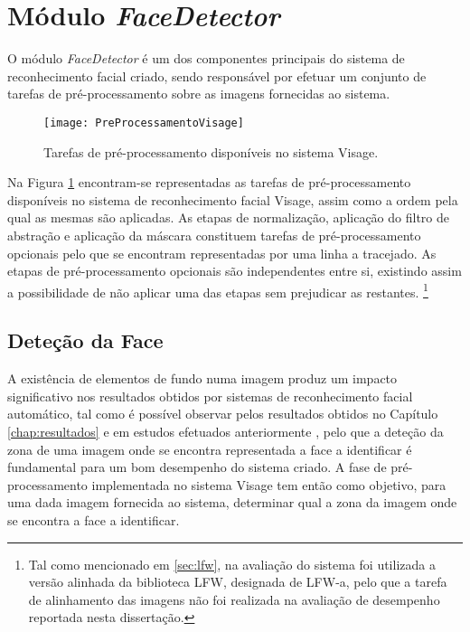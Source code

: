 \section{Módulo \textit{FaceDetector}} \label{sec:facedetector}
O módulo \textit{FaceDetector} é um dos componentes principais do sistema de reconhecimento facial criado, sendo responsável por efetuar um conjunto de tarefas de pré-processamento sobre as imagens fornecidas ao sistema.

\begin{figure}[t]
  \begin{center}
    \leavevmode
    \texttt{[image: PreProcessamentoVisage]}
    \caption{Tarefas de pré-processamento disponíveis no sistema Visage.}
    \label{fig:preprocessamento}
  \end{center}
\end{figure}


Na Figura \ref{fig:preprocessamento} encontram-se representadas as tarefas de pré-processamento disponíveis no sistema de reconhecimento facial Visage, assim como a ordem pela qual as mesmas são aplicadas. As etapas de normalização, aplicação do filtro de abstração e aplicação da máscara constituem tarefas de pré-processamento opcionais pelo que se encontram representadas por uma linha a tracejado. As etapas de pré-processamento opcionais são independentes entre si, existindo assim a possibilidade de não aplicar uma das etapas sem prejudicar as restantes.  \footnote{Tal como mencionado em \ref{sec:lfw}, na avaliação do sistema foi utilizada a versão alinhada da biblioteca LFW, designada de LFW-a, pelo que a tarefa de alinhamento das imagens não foi realizada na avaliação de desempenho reportada nesta dissertação.}

\subsection{Deteção da Face} \label{sec:detecao_face}
A existência de elementos de fundo numa imagem produz um impacto significativo nos resultados obtidos por sistemas de reconhecimento facial automático, tal como é possível observar pelos resultados obtidos no Capítulo \ref{chap:resultados} e em estudos efetuados anteriormente \cite{Kumar2009}, pelo que a deteção da zona de uma imagem onde se encontra representada a face a identificar é fundamental para um bom desempenho do sistema criado. A fase de pré-processamento implementada no sistema Visage tem então como objetivo, para uma dada imagem fornecida ao sistema, determinar qual a zona da imagem onde se encontra a face a identificar.

